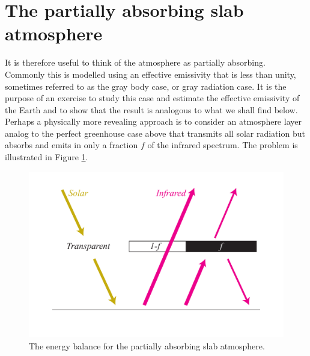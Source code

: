 \documentclass[12pt]{book}
\begin{document}
\section{The partially absorbing slab atmosphere}
It is therefore useful to think of the atmosphere as partially absorbing. Commonly this is modelled using an effective emissivity that is less than unity, sometimes referred to as the gray body case, or gray radiation case. 
It is the purpose of an exercise to study this case and estimate the effective emissivity of the Earth and to show that the result is analogous to what we shall find below. 
Perhaps a physically more revealing approach is to consider an atmosphere layer analog to the perfect greenhouse case above that transmits all solar radiation but absorbs and emits in only a fraction $f$ of the infrared spectrum. The problem is illustrated in Figure \ref{fig:partially_absorbing_atmosphere}.

\begin{figure}
\begin{center}
\includegraphics[width=12 cm]{../illustrations/Partially_absorbing_atmosphere}
\end{center}
\caption{ The energy balance for the partially absorbing slab atmosphere.    } 
\label{fig:partially_absorbing_atmosphere}
\end{figure}
\end{document}
